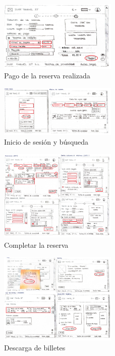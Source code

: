 \begin{figure}[H]
    \centering
    \includegraphics[width=0.5\textwidth]{Imagenes/Keypath/Isabel4.png}
    \caption{Pago de la reserva realizada}
    \label{fig:Isabel4}
\end{figure}

\begin{figure}[H]
    \centering
    \includegraphics[width=0.5\textwidth]{Imagenes/Keypath/Isabel5.png}
    \caption{Inicio de sesión y búsqueda}
    \label{fig:Isabel5}
\end{figure}

\begin{figure}[H]
    \centering
    \includegraphics[width=0.5\textwidth]{Imagenes/Keypath/Isabel6.png}
    \caption{Completar la reserva}
    \label{fig:Isabel6}
\end{figure}

\begin{figure}[H]
    \centering
    \includegraphics[width=0.5\textwidth]{Imagenes/Keypath/Isabel7.png}
    \caption{Descarga de billetes}
    \label{fig:Isabel7}
\end{figure}

